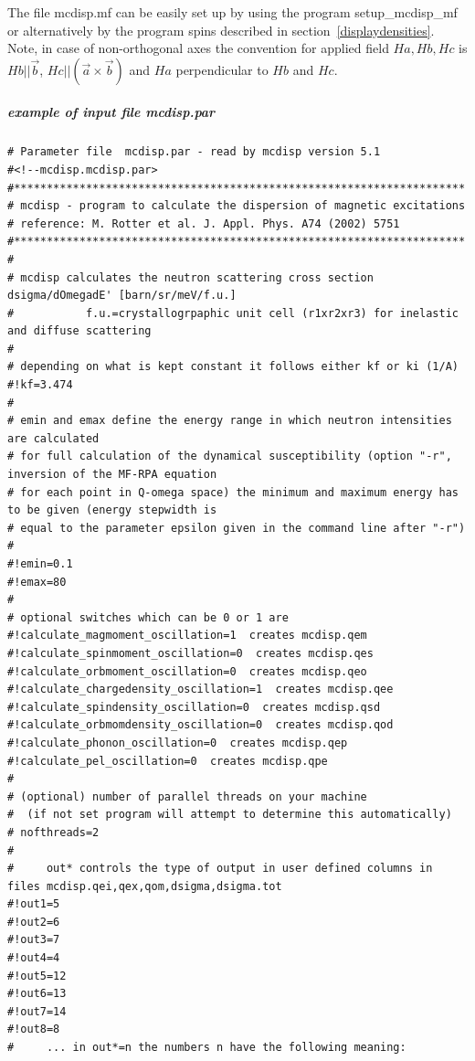 The file {\prg mcdisp.mf} can be easily set up by using the program {\prg %
setup\_mcdisp\_mf} or alternatively by the program {\prg spins} 
described in section~\ref{displaydensities}.
                            Note, in case of non-orthogonal axes the convention for applied field $Ha, Hb,Hc$                     
                            is $Hb||\vec b$, $Hc||(\vec a \times \vec b)$ and $Ha$ perpendicular to $Hb$ and $Hc$.

\subparagraph{example of input file {\prg mcdisp.par}}

{\footnotesize
\begin{verbatim}
# Parameter file  mcdisp.par - read by mcdisp version 5.1
#<!--mcdisp.mcdisp.par>
#*********************************************************************
# mcdisp - program to calculate the dispersion of magnetic excitations
# reference: M. Rotter et al. J. Appl. Phys. A74 (2002) 5751
#*********************************************************************
#
# mcdisp calculates the neutron scattering cross section dsigma/dOmegadE' [barn/sr/meV/f.u.]
#           f.u.=crystallogrpaphic unit cell (r1xr2xr3) for inelastic and diffuse scattering
#
# depending on what is kept constant it follows either kf or ki (1/A)
#!kf=3.474
# 
# emin and emax define the energy range in which neutron intensities are calculated
# for full calculation of the dynamical susceptibility (option "-r", inversion of the MF-RPA equation 
# for each point in Q-omega space) the minimum and maximum energy has to be given (energy stepwidth is 
# equal to the parameter epsilon given in the command line after "-r")
#
#!emin=0.1
#!emax=80
#
# optional switches which can be 0 or 1 are
#!calculate_magmoment_oscillation=1  creates mcdisp.qem
#!calculate_spinmoment_oscillation=0  creates mcdisp.qes
#!calculate_orbmoment_oscillation=0  creates mcdisp.qeo
#!calculate_chargedensity_oscillation=1  creates mcdisp.qee
#!calculate_spindensity_oscillation=0  creates mcdisp.qsd
#!calculate_orbmomdensity_oscillation=0  creates mcdisp.qod
#!calculate_phonon_oscillation=0  creates mcdisp.qep
#!calculate_pel_oscillation=0  creates mcdisp.qpe
#
# (optional) number of parallel threads on your machine
#  (if not set program will attempt to determine this automatically)
# nofthreads=2
#
#     out* controls the type of output in user defined columns in files mcdisp.qei,qex,qom,dsigma,dsigma.tot
#!out1=5 
#!out2=6 
#!out3=7 
#!out4=4 
#!out5=12 
#!out6=13 
#!out7=14 
#!out8=8 
#     ... in out*=n the numbers n have the following meaning:

\end{verbatim}}
